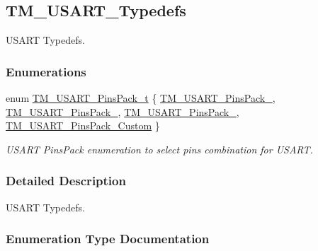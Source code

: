 \hypertarget{group___t_m___u_s_a_r_t___typedefs}{}\subsection{T\+M\+\_\+\+U\+S\+A\+R\+T\+\_\+\+Typedefs}
\label{group___t_m___u_s_a_r_t___typedefs}


U\+S\+A\+R\+T Typedefs.  


\subsubsection*{Enumerations}
\begin{DoxyCompactItemize}
\item 
enum \hyperlink{group___t_m___u_s_a_r_t___typedefs_gafa8a506eb27c93db067bb06039ae210f}{T\+M\+\_\+\+U\+S\+A\+R\+T\+\_\+\+Pins\+Pack\+\_\+t} \{ \hyperlink{group___t_m___u_s_a_r_t___typedefs_ggafa8a506eb27c93db067bb06039ae210fa94af1877da4d4b84340ff267ae13a3f4}{T\+M\+\_\+\+U\+S\+A\+R\+T\+\_\+\+Pins\+Pack\+\_}, 
\hyperlink{group___t_m___u_s_a_r_t___typedefs_ggafa8a506eb27c93db067bb06039ae210fa20e52aedd65d52a8285abf6ea5bda8b1}{T\+M\+\_\+\+U\+S\+A\+R\+T\+\_\+\+Pins\+Pack\+\_}, 
\hyperlink{group___t_m___u_s_a_r_t___typedefs_ggafa8a506eb27c93db067bb06039ae210fa9ac05e507f2948219af8594554d41bdb}{T\+M\+\_\+\+U\+S\+A\+R\+T\+\_\+\+Pins\+Pack\+\_}, 
\hyperlink{group___t_m___u_s_a_r_t___typedefs_ggafa8a506eb27c93db067bb06039ae210fa4bb4ccf03eef1dee9f00fb89cbff97b3}{T\+M\+\_\+\+U\+S\+A\+R\+T\+\_\+\+Pins\+Pack\+\_\+\+Custom}
 \}
\begin{DoxyCompactList}\small\item\em U\+S\+A\+R\+T Pins\+Pack enumeration to select pins combination for U\+S\+A\+R\+T. \end{DoxyCompactList}\end{DoxyCompactItemize}


\subsubsection{Detailed Description}
U\+S\+A\+R\+T Typedefs. 



\subsubsection{Enumeration Type Documentation}
\hypertarget{group___t_m___u_s_a_r_t___typedefs_gafa8a506eb27c93db067bb06039ae210f}{}
